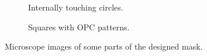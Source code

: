 \begin{figure}[!t]
\begin{subfigure}[t]{0.24\linewidth}
  	\centering
  	\caption{Internally touching circles.}
  	\label{fig:TS_05_20_13_54_28}
  \end{subfigure}
     \hfill
     \begin{subfigure}[t]{0.24\linewidth}
  	\centering
  	\caption{Squares with OPC patterns.}
  	\label{fig:TS_05_20_13_54_51}
  \end{subfigure}
\caption{Microscope images of some parts of the designed mask.}
 \end{figure}

